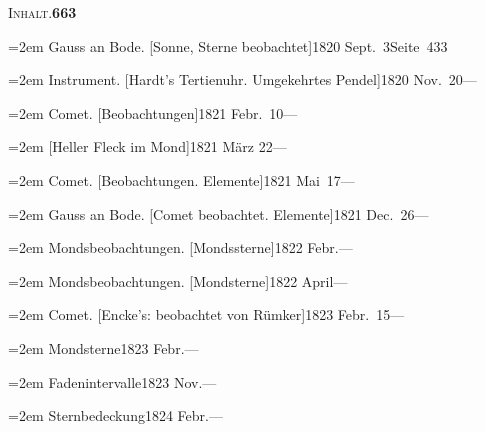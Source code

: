 \documentclass[12pt,a4paper]{article}
\begin{document}
{{{{{{{{\newpage

\begin{center}\small\textsc{Inhalt.}\quad\textbf{663}\end{center}

\vspace{0.3cm}

{\small
\noindent\hangindent=2em
Gauss an Bode. [Sonne, Sterne beobachtet]\hfill 1820 Sept.\ 3\quad Seite\ 433

\vspace{0.5mm}
\noindent\hangindent=2em
Instrument. [Hardt's Tertienuhr. Umgekehrtes Pendel]\hfill 1820 Nov.\ 20\quad ---

\vspace{0.5mm}
\noindent\hangindent=2em
Comet. [Beobachtungen]\hfill 1821 Febr.\ 10\quad ---

\vspace{0.5mm}
\noindent\hangindent=2em
[Heller Fleck im Mond]\hfill 1821 M\"arz 22\quad ---

\vspace{0.5mm}
\noindent\hangindent=2em
Comet. [Beobachtungen. Elemente]\hfill 1821 Mai\ 17\quad ---

\vspace{0.5mm}
\noindent\hangindent=2em
Gauss an Bode. [Comet beobachtet. Elemente]\hfill 1821 Dec.\ 26\quad ---

\vspace{0.5mm}
\noindent\hangindent=2em
Mondsbeobachtungen. [Mondssterne]\hfill 1822 Febr.\quad ---

\vspace{0.5mm}
\noindent\hangindent=2em
Mondsbeobachtungen. [Mondsterne]\hfill 1822 April\quad ---

\vspace{0.5mm}
\noindent\hangindent=2em
Comet. [Encke's: beobachtet von R\"umker]\hfill 1823 Febr.\ 15\quad ---

\vspace{0.5mm}
\noindent\hangindent=2em
Mondsterne\hfill 1823 Febr.\quad ---

\vspace{0.5mm}
\noindent\hangindent=2em
Fadenintervalle\hfill 1823 Nov.\quad ---

\vspace{0.5mm}
\noindent\hangindent=2em
Sternbedeckung\hfill 1824 Febr.\quad ---

}}}}}}}}}
\end{document}
